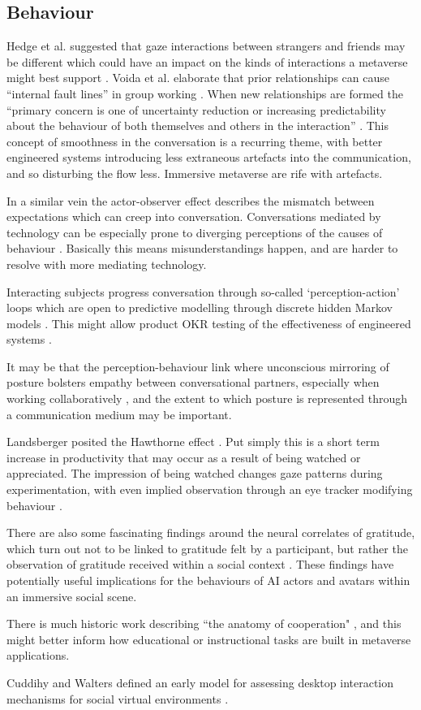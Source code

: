 \subsection{Behaviour}
Hedge et al. suggested that gaze interactions between strangers and friends may be different which could have an impact on the kinds of interactions a metaverse might best support \cite{Hedge1978}. Voida et al. elaborate that prior relationships can cause ``internal fault lines'' in group working \cite{Voida2012}. When new relationships are formed the ``primary concern is one of uncertainty reduction or increasing predictability about the behaviour of both themselves and others in the interaction'' \cite{Berger1975}. This concept of smoothness in the conversation is a recurring theme, with better engineered systems introducing less extraneous artefacts into the communication, and so disturbing the flow less. Immersive metaverse are rife with artefacts.\par 
In a similar vein the actor-observer effect describes the mismatch between expectations which can creep into conversation. Conversations mediated by technology can be especially prone to diverging perceptions of the causes of behaviour \cite{Jones1971}. Basically this means misunderstandings happen, and are harder to resolve with more mediating technology.\par 
Interacting subjects progress conversation through so-called `perception-action' loops which are open to predictive modelling through discrete hidden Markov models \cite{Mihoub2015}. This might allow product OKR testing of the effectiveness of engineered systems \cite{doerr2018measure}.\par
It may be that the perception-behaviour link where unconscious mirroring of posture bolsters empathy between conversational partners, especially when working collaboratively \cite{Chartrand1999}, and the extent to which posture is represented through a communication medium may be important.\par
Landsberger posited the Hawthorne effect \cite{Parsons1974}. Put simply this is a short term increase in productivity that may occur as a result of being watched or appreciated. The impression of being watched changes gaze patterns during experimentation, with even implied observation through an eye tracker modifying behaviour \cite{Risko2011}.\par
There are also some fascinating findings around the neural correlates of gratitude, which turn out not to be linked to gratitude felt by a participant, but rather the observation of gratitude received within a social context \cite{fox2015neural}. These findings have potentially useful implications for the behaviours of AI actors and avatars within an immersive social scene.\par
There is much historic work describing ``the anatomy of cooperation" \cite{Kollock1998}, and this might better inform how educational or instructional tasks are built in metaverse applications.\par
Cuddihy and Walters defined an early model for assessing desktop interaction mechanisms for social virtual environments \cite{Cuddihy2000}.                               
